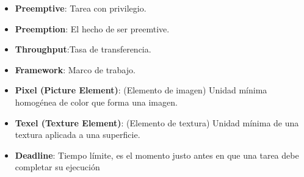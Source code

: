 \begin{itemize}
\item \textbf{Preemptive}: Tarea con privilegio.
\item \textbf{Preemption}: El hecho de ser preemtive.
\item \textbf{Throughput}:Tasa de transferencia.
\item \textbf{Framework}: Marco de trabajo.
\item \textbf{Pixel (Picture Element)}: (Elemento de imagen) Unidad mínima homogénea de color que forma una imagen.
\item \textbf{Texel (Texture Element)}: (Elemento de textura)  Unidad mínima de una textura aplicada a una superficie.

\item \textbf{Deadline}: Tiempo límite, es el momento justo antes en que una tarea debe completar su ejecución

\end{itemize}  